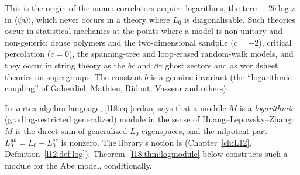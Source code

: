 This is the origin of the name: correlators acquire logarithms, the term $-2b\log z$ in
$\langle\psi\psi\rangle$, which never occurs in a theory where $L_0$ is diagonalisable. Such theories occur in statistical
mechanics at the points where a model is non-unitary and non-generic: dense polymers and the
two-dimensional sandpile ($c=-2$), critical percolation ($c=0$), the spanning-tree and loop-erased
random-walk models, and they occur in string theory as the $bc$ and $\beta\gamma$ ghost sectors and
as worldsheet theories on supergroups. The constant $b$ is a genuine invariant (the ``logarithmic
coupling'' of Gaberdiel, Mathieu, Ridout, Vasseur and others).

In vertex-algebra language, \eqref{l18:eq:jordan} says that a module $M$ is a \emph{logarithmic}
(grading-restricted generalized) module in the sense of Huang--Lepowsky--Zhang: $M$ is the direct
sum of generalized $L_0$-eigenspaces, and the nilpotent part $L_0^{\mathrm{nil}}=L_0-L_0^{ss}$ is
nonzero. The library's notion is  (Chapter~\ref{ch:L12},
Definition~\ref{l12:def:log}); Theorem~\ref{l18:thm:logmodule} below constructs such a module for
the Abe model, conditionally.

